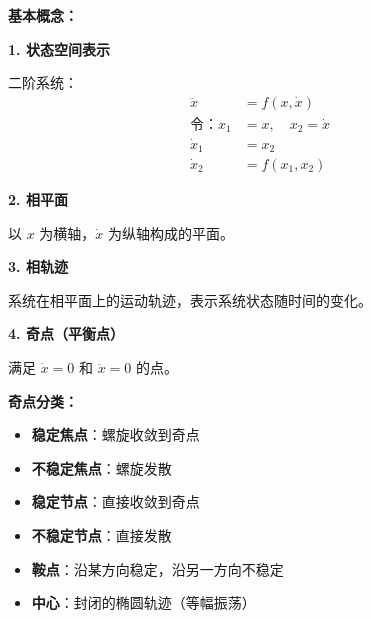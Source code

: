 \begin{minipage}[t]{0.52\textwidth}
\textbf{基本概念：}

\textbf{1. 状态空间表示}

二阶系统：
\begin{align*}
\ddot{x} &= f(x, \dot{x}) \\
\text{令：} x_1 &= x, \quad x_2 = \dot{x} \\
\dot{x}_1 &= x_2 \\
\dot{x}_2 &= f(x_1, x_2)
\end{align*}

\textbf{2. 相平面}

以 $x$ 为横轴，$\dot{x}$ 为纵轴构成的平面。

\textbf{3. 相轨迹}

系统在相平面上的运动轨迹，表示系统状态随时间的变化。

\textbf{4. 奇点（平衡点）}

满足 $\dot{x} = 0$ 和 $\ddot{x} = 0$ 的点。

\vspace{0.3cm}
\textbf{奇点分类：}

\begin{itemize}
    \item \textbf{稳定焦点}：螺旋收敛到奇点
    \item \textbf{不稳定焦点}：螺旋发散
    \item \textbf{稳定节点}：直接收敛到奇点
    \item \textbf{不稳定节点}：直接发散
    \item \textbf{鞍点}：沿某方向稳定，沿另一方向不稳定
    \item \textbf{中心}：封闭的椭圆轨迹（等幅振荡）
\end{itemize}
\end{minipage}\hfill
